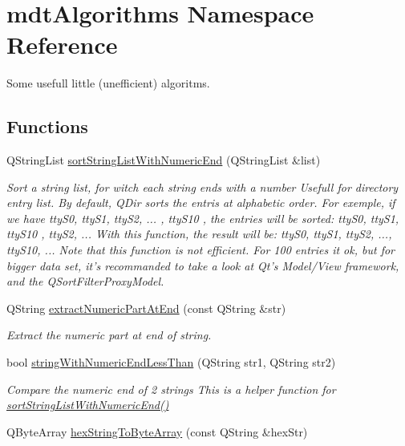 \hypertarget{namespacemdt_algorithms}{
\section{mdtAlgorithms Namespace Reference}
\label{namespacemdt_algorithms}
}


Some usefull little (unefficient) algoritms.  


\subsection*{Functions}
\begin{DoxyCompactItemize}
\item 
QStringList \hyperlink{namespacemdt_algorithms_a1a3e54a0c5c508c2ea531c7c6200588e}{sortStringListWithNumericEnd} (QStringList \&list)
\begin{DoxyCompactList}\small\item\em Sort a string list, for witch each string ends with a number Usefull for directory entry list. By default, QDir sorts the entris at alphabetic order. For exemple, if we have ttyS0, ttyS1, ttyS2, ... , ttyS10 , the entries will be sorted: ttyS0, ttyS1, ttyS10 , ttyS2, ... With this function, the result will be: ttyS0, ttyS1, ttyS2, ..., ttyS10, ... Note that this function is not efficient. For 100 entries it ok, but for bigger data set, it's recommanded to take a look at Qt's Model/View framework, and the QSortFilterProxyModel. \end{DoxyCompactList}\item 
QString \hyperlink{namespacemdt_algorithms_adfeb44a0a2a440a6b200ad19db73ac45}{extractNumericPartAtEnd} (const QString \&str)
\begin{DoxyCompactList}\small\item\em Extract the numeric part at end of string. \end{DoxyCompactList}\item 
bool \hyperlink{namespacemdt_algorithms_a11d5a1ebe9a68710e6e78f768ac9203c}{stringWithNumericEndLessThan} (QString str1, QString str2)
\begin{DoxyCompactList}\small\item\em Compare the numeric end of 2 strings This is a helper function for \hyperlink{namespacemdt_algorithms_a1a3e54a0c5c508c2ea531c7c6200588e}{sortStringListWithNumericEnd()} \end{DoxyCompactList}\item 
QByteArray \hyperlink{namespacemdt_algorithms_a5094251abb1557b9b4717b3a0f1a8535}{hexStringToByteArray} (const QString \&hexStr)

\end{DoxyCompactItemize}
